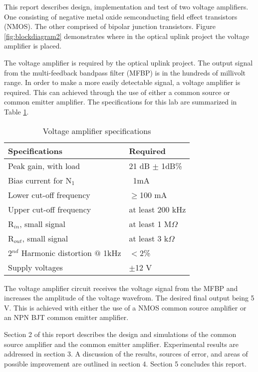 




\noindent This report describes design, implementation and test of two voltage amplifiers. One consisting of negative metal oxide semconducting field effect transistors (NMOS). The other comprised of bipolar junction transistors. Figure \ref{fig:blockdiagram2} demonstrates where in the optical uplink project the voltage amplifier is placed. 




The voltage amplifier is required by the optical uplink project. The output signal from the multi-feedback bandpass filter (MFBP) is in the hundreds of millivolt range. In order to make a more easily detectable signal, a voltage amplifier is required. This can achieved through the use of either a common source or common emitter amplifier. The specifications for this lab are summarized in Table \ref{tab:specifications}.

\begin{table}[H]
	\centering
	\caption{Voltage amplifier specifications}
	\label{tab:specifications}
	\begin{tabular}{|l|l|}
		\hline
		Specifications & Required       \\ \hline
		Peak gain, with load      & 21 dB $\pm$ 1dB\% \\ \hline
		Bias current for N$_1$     & ~1mA          \\ \hline
		Lower cut-off frequency      & $\geq$100 mA    \\ \hline
		Upper cut-off frequency    &  at least 200 kHz \\ \hline
		R$_{in}$, small signal       &  at least 1 M$\Omega$ \\ \hline
		R$_{out}$, small signal      &  at least 3 k$\Omega$ \\ \hline
		2$^{nd}$ Harmonic distortion $@$ 1kHz  & $<$2\% \\ \hline
		Supply voltages            &  $\pm$12 V     \\  \hline
	\end{tabular}
\end{table}


The voltage amplifier circuit receives the voltage signal from the MFBP and increases the amplitude of the voltage wavefrom. The desired final output being 5 V. This is achieved with either the use of a NMOS common source amplifier or an NPN BJT common emitter amplifier.


Section 2 of this report describes the design and simulations of the common source amplifier and the common emitter amplifier. Experimental results are addressed in section 3. A discussion of the results, sources of error, and areas of possible improvement are outlined in section 4. Section 5 concludes this report. \newline



